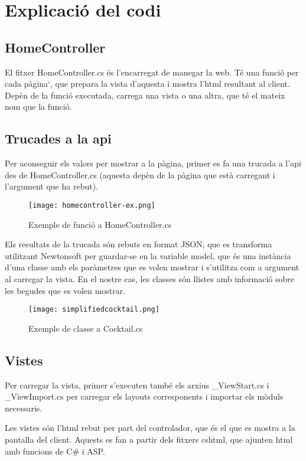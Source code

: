\section{Explicaci\'o del codi}

\subsection{HomeController}
El fitxer HomeController.cs \'es l'encarregat de manegar la web.
T\'e una funci\'o per cada p\`agina`,
que prepara la vista d'aquesta i mostra l'html resultant al client.
Dep\`en de la funci\'o executada, carrega una vista o una altra,
que t\'e el mateix nom que la funci\'o.


\subsection{Trucades a la api}
Per aconseguir els valors per mostrar a la p\`agina,
primer es fa una trucada a l'api des de HomeController.cs
(aquesta dep\`en de la p\`agina que est\`a carregant i l'argument que ha rebut).

\begin{figure}[!h]
	\centering
	\texttt{[image: homecontroller-ex.png]}
	\caption{Exemple de funci\'o a HomeController.cs}
\end{figure}

Els resultats de la trucada s\'on rebuts en format JSON,
que es transforma utilitzant Newtonsoft per guardar-se en la variable model,
que \'es una inst\`ancia d'una classe amb els par\`ametres que es volen mostrar
i s'utilitza com a argument al carregar la vista.
En el nostre cas, les classes s\'on llistes amb informaci\'o sobre
les begudes que es volen mostrar.

\begin{figure}[!h]
	\centering
	\texttt{[image: simplifiedcocktail.png]}
	\caption{Exemple de classe a Cocktail.cs}
\end{figure}


\subsection{Vistes}
Per carregar la vista,
primer s'executen tamb\'e els arxius \_ViewStart.cs i \_ViewImport.cs
per carregar els layouts corresponents i importar els m\`oduls necessaris.

Les vistes s\'on l'html rebut per part del controlador,
que \'es el que es mostra a la pantalla del client.
Aquests es fan a partir dels fitxers cshtml,
que ajunten html amb funcions de C\# i ASP.


